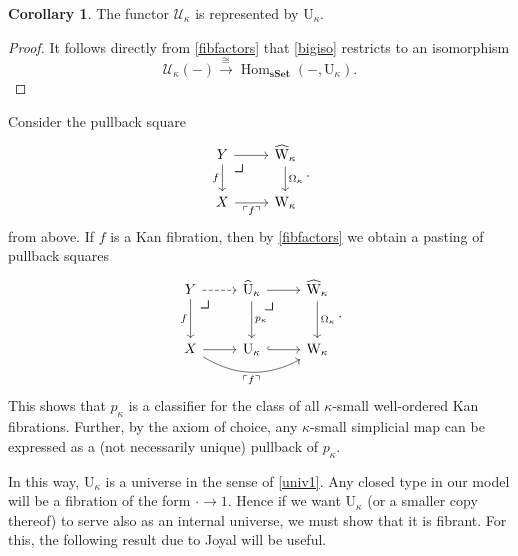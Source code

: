 \documentclass[10pt,letterpaper,cm]{nupset}
\theoremstyle{definition}
\theoremstyle{theorem}
\newtheorem{corollary}[definition]{Corollary}
\theoremstyle{remark}
\newcommand{\0}{\mathbf{0}}
\newcommand{\1}{\mathbf{1}}
\newcommand{\2}{\mathbf{2}}
\DeclareMathOperator{\sset}{\mathbf{sSet}}
\DeclareMathOperator{\Hom}{Hom}
\begin{document}
\begin{corollary}\label{Urep}
The functor $\mathcal{U}_{\kappa}$ is represented by $\mathrm{U}_{\kappa}$.
\end{corollary}
\begin{proof}
It follows directly  from \cref{fibfactors} that \eqref{bigiso} restricts to an isomorphism
\[
\mathcal{U}_{\kappa}({-})     \overset{\cong}{\longrightarrow} \Hom_{\sset}({-}, \mathrm{U}_{\kappa}).
\]
\end{proof}

Consider the pullback square
\[
\begin{tikzcd}
Y \arrow[d, "f"'] \arrow[r]    \arrow[dr, phantom, "\scalebox{1.5}{\color{black}$\lrcorner$}" , very near start, color=black]
       & \widehat{\mathrm{W}}_{\kappa} \arrow[d, "\Omega_{\kappa}"] \\
X \arrow[r, "\ulcorner{f}\urcorner"'] & \mathrm{W}_{\kappa}                                       
\end{tikzcd}.
\] 
from above. If $f$ is a Kan fibration, then by \cref{fibfactors} we obtain a pasting of pullback squares
\[
\begin{tikzcd}[row sep=large]
Y \arrow[d, "f"'] \arrow[r, dashed]       \arrow[dr, phantom, "\scalebox{1.5}{\color{black}$\lrcorner$}" , very near start, color=black]
                            & \widehat{\mathrm{U}}_{\kappa} \arrow[r] \arrow[d, "p_{\kappa}"] 
                             \arrow[dr, phantom, "\scalebox{1.5}{\color{black}$\lrcorner$}" , very near start, color=black]
                             & \widehat{\mathrm{W}}_{\kappa} \arrow[d, "\Omega_{\kappa}"] \\
X \arrow[rr, "\ulcorner{f}\urcorner"', bend right] \arrow[r] & \mathrm{U}_{\kappa} \arrow[r, hook]                             & \mathrm{W}_{\kappa}                                       
\end{tikzcd}.
\] This shows that $p_{\kappa}$ is a classifier for the class of all $\kappa$-small well-ordered Kan fibrations. Further, by the axiom of choice, any $\kappa$-small simplicial map can be expressed as a (not necessarily unique) pullback of $p_{\kappa}$. 

\bigskip

In this way, $\mathrm{U}_{\kappa}$ is a universe in the sense of \cref{univ1}. Any closed type in our model will be a fibration of the form $ \boldsymbol{\cdot} \to 1$. Hence if we want $\mathrm{U}_{\kappa}$ (or a smaller copy thereof) to serve also as an internal universe, we must show that it is fibrant.
For this, the following result due to Joyal will be useful.
\end{document}
